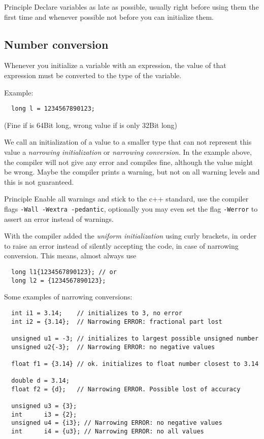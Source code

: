 \begin{guideline}{Principle}
  Declare variables as late as possible, usually right before using them the first time and whenever possible not before you can initialize them.
\end{guideline}



\subsection{Number conversion}
Whenever you initialize a variable with an expression, the value of that expression must be converted to the type of the variable.

Example:
\begin{verbatim}
  long l = 1234567890123;
\end{verbatim}
(Fine if  is 64Bit long, wrong value if  is only 32Bit long)

We call an initialization of a value to a smaller type that can not represent this value a \emph{narrowing initialization} or
\emph{narrowing conversion}. In the example above, the compiler will not give any error and compiles fine, although the value might be wrong.
Maybe the compiler prints a warning, but not on all warning levels and this is not guaranteed.

\begin{guideline}{Principle}
  Enable all warnings and stick to the c++ standard, \ie use the compiler flags \texttt{-Wall -Wextra -pedantic}, optionally you may
  even set the flag \texttt{-Werror} to assert an error instead of warnings.
\end{guideline}

With\marginpar{[\cxx{11}]}  the compiler added the \emph{uniform initialization} using curly brackets, in order to raise an error
instead of silently accepting the code, in case of narrowing conversion. This means, almost always use
\begin{verbatim}
  long l1{1234567890123}; // or
  long l2 = {1234567890123};
\end{verbatim}

Some examples of narrowing conversions:
\begin{verbatim}
  int i1 = 3.14;    // initializes to 3, no error
  int i2 = {3.14};  // Narrowing ERROR: fractional part lost

  unsigned u1 = -3; // initializes to largest possible unsigned number
  unsigned u2{-3};  // Narrowing ERROR: no negative values

  float f1 = {3.14} // ok. initializes to float number closest to 3.14

  double d = 3.14;
  float f2 = {d};   // Narrowing ERROR. Possible lost of accuracy

  unsigned u3 = {3};
  int      i3 = {2};
  unsigned u4 = {i3}; // Narrowing ERROR: no negative values
  int      i4 = {u3}; // Narrowing ERROR: no all values
\end{verbatim}

